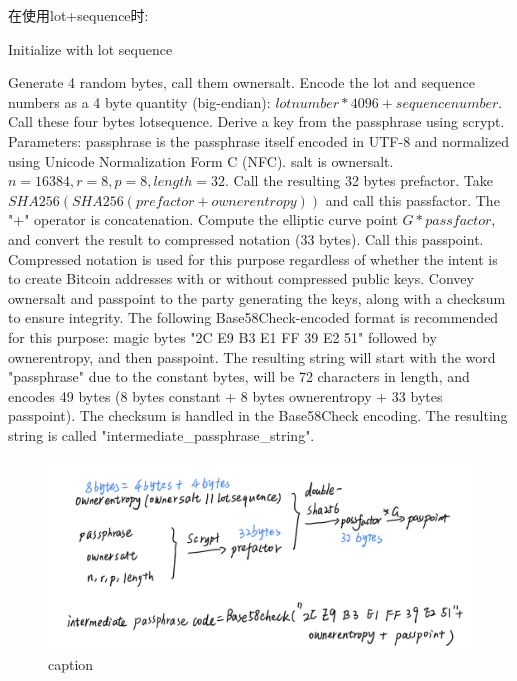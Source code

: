 在使用lot+sequence时:  

\begin{algorithm}[tbp]\footnotesize
\caption{Initialize with lot sequence}
  	\begin{algorithmic}[1]
	    \STATE Generate 4 random bytes, call them ownersalt. 
		\STATE Encode the lot and sequence numbers as a 4 byte quantity (big-endian): $lotnumber * 4096 + sequencenumber$. Call these four bytes lotsequence.
		\STATE Derive a key from the passphrase using scrypt. 
		\STATE Parameters: passphrase is the passphrase itself encoded in UTF-8 and normalized using Unicode Normalization Form C (NFC). salt is ownersalt. $n=16384, r=8, p=8, length=32$.
		\STATE Call the resulting 32 bytes prefactor.
		\STATE Take $SHA256(SHA256(prefactor + ownerentropy))$ and call this passfactor. The "+" operator is concatenation.
		\STATE Compute the elliptic curve point $G * passfactor$, and convert the result to compressed notation (33 bytes). Call this passpoint. Compressed notation is used for this purpose regardless of whether the intent is to create Bitcoin addresses with or without compressed public keys.
		\STATE Convey ownersalt and passpoint to the party generating the keys, along with a checksum to ensure integrity.
		\STATE The following Base58Check-encoded format is recommended for this purpose: magic bytes "2C E9 B3 E1 FF 39 E2 51" followed by ownerentropy, and then passpoint. The resulting string will start with the word "passphrase" due to the constant bytes, will be 72 characters in length, and encodes 49 bytes (8 bytes constant + 8 bytes ownerentropy + 33 bytes passpoint). The checksum is handled in the Base58Check encoding. The resulting string is called "intermediate_passphrase_string".

    \end{algorithmic}
\end{algorithm}


\begin{figure}[h]
\centering
\includegraphics[width=.7\textwidth]{./im-code1.png}
\caption{caption}\label{fig-parsesig}
\end{figure}

